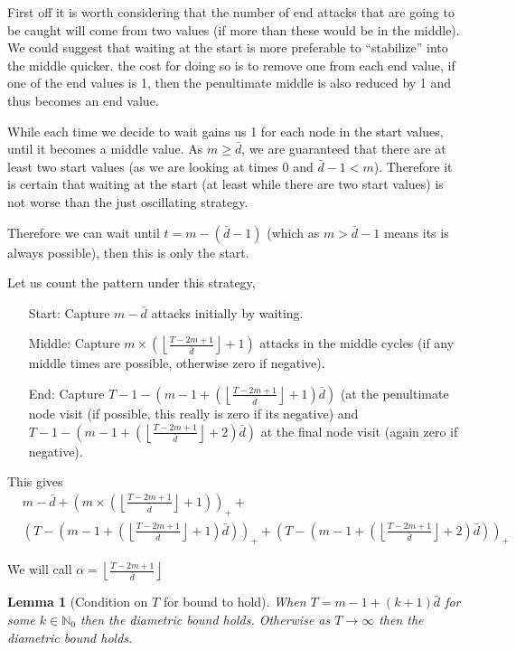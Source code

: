 \documentclass[a4paper,10pt]{article}
\newcommand{\floor}[1]{\left \lfloor #1 \right \rfloor}
\newcommand{\pospart}[1]{\left( #1 \right)_{+}}
\newtheorem{lemma}[theorem]{Lemma}
\theoremstyle{definition}
\theoremstyle{definition}
\theoremstyle{remark}
\theoremstyle{definition}
\begin{document}
First off it is worth considering that the number of end attacks that are going to be caught will come from two values (if more than these would be in the middle). We could suggest that waiting at the start is more preferable to ``stabilize'' into the middle quicker. the cost for doing so is to remove one from each end value, if one of the end values is 1, then the penultimate middle is also reduced by 1 and thus becomes an end value.

While each time we decide to wait gains us 1 for each node in the start values, until it becomes a middle value. As $m \geq \bar{d}$, we are guaranteed that there are at least two start values (as we are looking at times $0$ and $\bar{d}-1 < m$). Therefore it is certain that waiting at the start (at least while there are two start values) is not worse than the just oscillating strategy.

Therefore we can wait until $t=m-(\bar{d}-1)$ (which as $m > \bar{d}-1$ means its is always possible), then this is only the start.

Let us count the pattern under this strategy,
\begin{itemize}
\item[Start:] Capture $m-\bar{d}$ attacks initially by waiting.
\item[Middle:] Capture $m \times (\floor{\frac{T-2m+1}{\bar{d}}}+1)$ attacks in the middle cycles (if any middle times are possible, otherwise zero if negative).
\item[End:] Capture $T-1-(m-1+(\floor{\frac{T-2m+1}{\bar{d}}}+1)\bar{d})$ (at the penultimate node visit (if possible, this really is zero if its negative) and $T-1-(m-1+(\floor{\frac{T-2m+1}{\bar{d}}}+2)\bar{d})$ at the final node visit (again zero if negative).
\end{itemize}

This gives \begin{align*}
& m-\bar{d}+\pospart{m \times (\floor{\frac{T-2m+1}{\bar{d}}}+1)} + \\ &\pospart{T-(m-1+(\floor{\frac{T-2m+1}{\bar{d}}}+1)\bar{d})} + \pospart{T-(m-1+(\floor{\frac{T-2m+1}{\bar{d}}}+2)\bar{d})}
\end{align*}

We will call $\alpha=\floor{\frac{T-2m+1}{\bar{d}}}$

\begin{lemma}[Condition on $T$ for bound to hold]
When $T=m-1+(k+1)\bar{d}$ for some $k \in \mathbb{N}_{0}$ then the diametric bound holds. Otherwise as $T \rightarrow \infty$ then the diametric bound holds.
\end{lemma}
\end{document}
